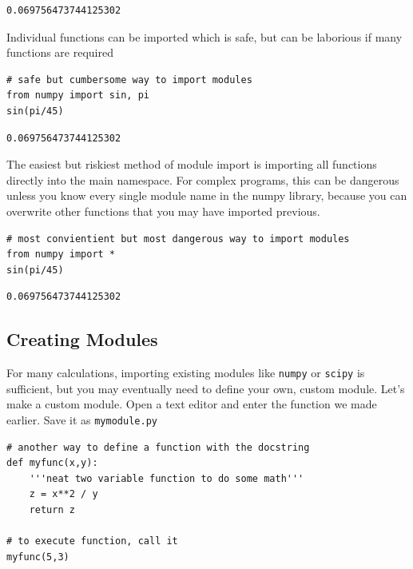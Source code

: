 \documentclass[%
oneside,                 %
final,                   %
10pt]{article}
\begin{document}
\begin{verbatim}
0.069756473744125302
\end{verbatim}

Individual functions can be imported which is safe, but can be laborious if many functions are required
\begin{verbatim}
# safe but cumbersome way to import modules
from numpy import sin, pi
sin(pi/45)
\end{verbatim}

\begin{verbatim}
0.069756473744125302
\end{verbatim}

The easiest but riskiest method of module import is importing all functions directly into the main namespace. For complex programs, this can be dangerous unless you know every single module name in the numpy library, because you can overwrite other functions that you may have imported previous.

\begin{verbatim}
# most convientient but most dangerous way to import modules
from numpy import *
sin(pi/45)
\end{verbatim}

\begin{verbatim}
0.069756473744125302
\end{verbatim}

\subsection{Creating Modules}

For many calculations, importing existing modules like \texttt{numpy} or \texttt{scipy} is sufficient, but you may eventually need to define your own, custom module. Let's make a custom module. Open a text editor and enter the function we made earlier. Save it as \texttt{mymodule.py}

\begin{verbatim}
# another way to define a function with the docstring
def myfunc(x,y):
    '''neat two variable function to do some math'''
    z = x**2 / y
    return z

# to execute function, call it
myfunc(5,3)
\end{verbatim}
\end{document}
